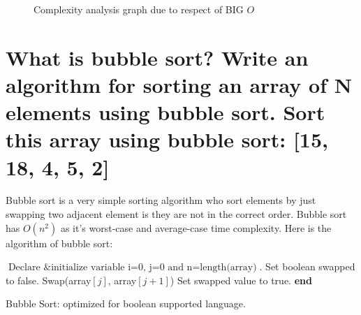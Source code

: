 \documentclass[11 pt]{article}
\begin{document}
	\begin{figure}[h!]
	\centering
	\caption{Complexity analysis graph due to respect of BIG $O$}
	\end{figure}

\pagebreak

\section{What is bubble sort? Write an algorithm for sorting an array of N elements using bubble sort. Sort this array using bubble sort: [15, 18, 4, 5, 2]}
\justify
{
Bubble sort is a very simple sorting algorithm who sort elements by just swapping two adjacent element is they are not in the correct order. Bubble sort has $O(n^2)$ as it's worst-case and average-case time complexity. Here is the algorithm of bubble sort:
}
\begin{algorithm}
\DontPrintSemicolon
{}
\Begin
{
$\textrm{Declare \& initialize variable i=0, j=0 and n}=\textrm{length(array)}$.\;
Set boolean swapped to false.\;
{
	{
		{
			Swap(array$[j]$, array$[j+1]$)\;
			Set swapped value to true.
		}
	}
}
}
\textbf{end}
\caption{Bubble Sort: optimized for boolean supported language.}
\end{algorithm}
\end{document}
